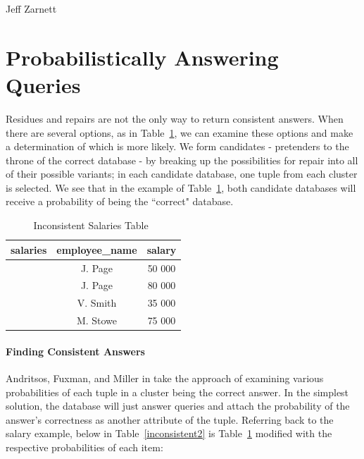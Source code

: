 



 {\term}{Jeff Zarnett}

\section*{Probabilistically Answering Queries}


Residues and repairs are not the only way to return consistent answers. When there are several options, as in Table~\ref{inconsistent1}, we can examine these options and make a determination of which is more likely. We form candidates - pretenders to the throne of the correct database -  by breaking up the possibilities for repair into all of their possible variants; in each candidate database, one tuple from each cluster is selected. We see that in the example of Table~\ref{inconsistent1}, both candidate databases will receive a probability of being the ``correct" database.

\begin{table}[h]\begin{center}
        \begin{tabular}{r | c  c} 
					salaries & employee\_name & salary \\ \hline
	           		 & J. Page  & 50 000 \\ 
	         		 & J. Page  & 80 000 \\ 
					 & V. Smith & 35 000 \\ 
					 & M. Stowe & 75 000 \\ 
        \end{tabular}
        \caption[Inconsistent Salaries Table]{Inconsistent Salaries Table~\cite{CQ}\label{inconsistent1}}
\end{center}\end{table}

\paragraph{Finding Consistent Answers}
Andritsos, Fuxman, and Miller in \cite{CA} take the approach of examining various probabilities of each tuple in a cluster being the correct answer. In the simplest solution, the database will just answer queries and attach the probability of the answer's correctness as another attribute of the tuple. Referring back to the salary example, below in Table~\ref{inconsistent2} is Table~\ref{inconsistent1} modified with the respective probabilities of each item:


